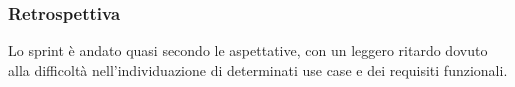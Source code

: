 \subsubsection{Retrospettiva}
Lo sprint è andato quasi secondo le aspettative, con un leggero ritardo dovuto alla difficoltà nell'individuazione di determinati use case e dei requisiti funzionali.\\